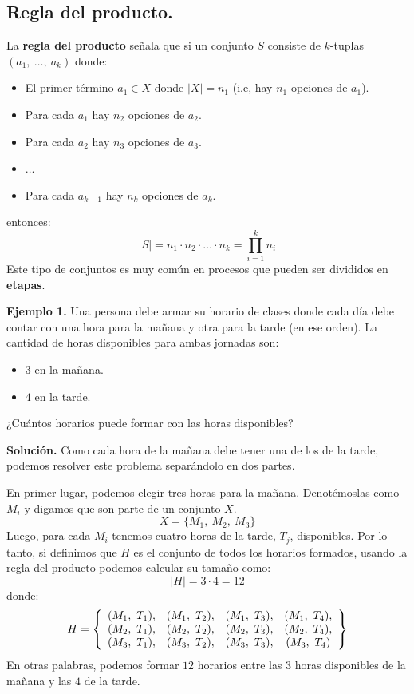 \documentclass[12pt]{article}
\begin{document}
\subsection{Regla del producto.}

La \textbf{regla del producto} señala que si un conjunto $S$ consiste de $k$-tuplas $(a_{1}, \ \ldots, \ a_{k})$ donde:

\begin{itemize}
\item El primer término $a_{1} \in X$ donde $|X| = n_{1}$ (i.e, hay $n_{1}$ opciones de $a_{1}$).
\item Para cada $a_{1}$ hay $n_{2}$ opciones de $a_{2}$.
\item Para cada $a_{2}$ hay $n_{3}$ opciones de $a_{3}$.
\item $\ldots$
\item Para cada $a_{k - 1}$ hay $n_{k}$ opciones de $a_{k}$.
\end{itemize}

entonces:
\[
  |S| = n_{1} \cdot n_{2} \cdot \ldots \cdot n_{k} = \prod_{i = 1}^{k} n_{i}
\]
Este tipo de conjuntos es muy común en procesos que pueden ser divididos en \textbf{etapas}.

\textbf{Ejemplo 1.} Una persona debe armar su horario de clases donde cada día debe contar con una hora para la mañana y otra para la tarde (en ese orden). La cantidad de horas disponibles para ambas jornadas son:

\begin{itemize}
\item $3$ en la mañana.
\item $4$ en la tarde.
\end{itemize}

¿Cuántos horarios puede formar con las horas disponibles?

\textbf{Solución.} Como cada hora de la mañana debe tener una de los de la tarde, podemos resolver este problema separándolo en dos partes.

En primer lugar, podemos elegir tres horas para la mañana. Denotémoslas como $M_{i}$ y digamos que son parte de un conjunto $X$.
\[
  X = \{M_{1}, \ M_{2}, \ M_{3}\}
\]
Luego, para cada $M_{i}$ tenemos cuatro horas de la tarde, $T_{j}$, disponibles. Por lo tanto, si definimos que $H$ es el conjunto de todos los horarios formados, usando la regla del producto podemos calcular su tamaño como:
\[
  |H| = 3 \cdot 4 = 12
\]
donde:
\[
H =
\left\{
\begin{array}{c c c c}
(M_{1}, \ T_{1}), & (M_{1}, \ T_{2}), & (M_{1}, \ T_{3}), & (M_{1}, \ T_{4}), \\
(M_{2}, \ T_{1}), & (M_{2}, \ T_{2}), & (M_{2}, \ T_{3}), & (M_{2}, \ T_{4}), \\
(M_{3}, \ T_{1}), & (M_{3}, \ T_{2}), & (M_{3}, \ T_{3}), & (M_{3}, \ T_{4})
\end{array}
\right\}
\]
En otras palabras, podemos formar $12$ horarios entre las $3$ horas disponibles de la mañana y las $4$ de la tarde.
\end{document}

